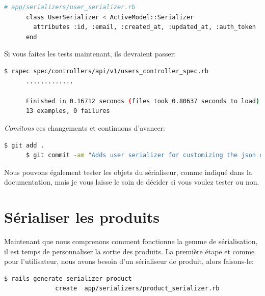 \documentclass[]{report}
\begin{document}
    \begin{scriptsize}
      \begin{lstlisting}[language=bash]
      # app/serializers/user_serializer.rb
      class UserSerializer < ActiveModel::Serializer
        attributes :id, :email, :created_at, :updated_at, :auth_token
      end
      \end{lstlisting}
    \end{scriptsize}

    Si vous faites les tests maintenant, ils devraient passer:

    \begin{scriptsize}
      \begin{lstlisting}[language=bash]
      $ rspec spec/controllers/api/v1/users_controller_spec.rb
      .............

      Finished in 0.16712 seconds (files took 0.80637 seconds to load)
      13 examples, 0 failures
      \end{lstlisting}
    \end{scriptsize}

    \textit{Comitons} ces changements et continuons d'avancer:

    \begin{scriptsize}
      \begin{lstlisting}[language=bash]
      $ git add .
      $ git commit -am "Adds user serializer for customizing the json output"
      \end{lstlisting}
    \end{scriptsize}

    Nous pouvons également tester les objets du sérialiseur, comme indiqué dans la documentation, mais je vous laisse le soin de décider si vous voulez tester ou non.

  \section{Sérialiser les produits}

    Maintenant que nous comprenons comment fonctionne la gemme de sérialisation, il est temps de personnaliser la sortie des produits. La première étape et comme pour l'utilisateur, nous avons besoin d'un sérialiseur de produit, alors faisons-le:

    \begin{scriptsize}
      \begin{lstlisting}[language=bash]
      $ rails generate serializer product
              create  app/serializers/product_serializer.rb
      \end{lstlisting}
    \end{scriptsize}
\end{document}
